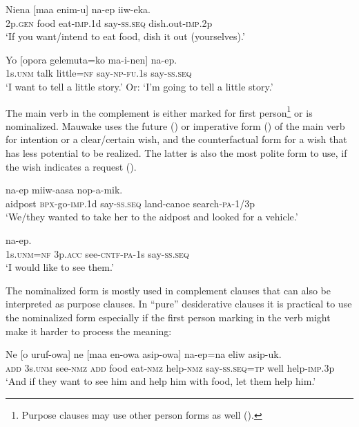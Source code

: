 \ea%
\label{ex:x367}
\gll Niena  [maa  enim-u]  na-ep  iiw-eka. \\
2p.\textsc{gen} food eat-\textsc{imp}.1d say-\textsc{ss}.\textsc{seq} dish.out-\textsc{imp}.2p\\
\glt`If you want/intend to eat food, dish it out (yourselves).'
\z


\ea%
\label{ex:x368}
\gll Yo  [opora  gelemuta=ko  ma-i-nen]  na-ep.\\
1s.\textsc{unm} talk  little=\textsc{nf} say-\textsc{np}-\textsc{fu}.1s  say-\textsc{ss}.\textsc{seq}\\
\glt`I want to tell a little story.' Or: `I'm going to tell a little story.'
\z


The main verb in the complement is either marked for first person\footnote{Purpose clauses may use other person forms as well ().} or is nominalized. Mauwake uses the future () or imperative form () of the main verb for intention or a clear/certain wish, and the counterfactual form for a wish that has less potential to be realized. The latter is also the most polite form to use, if the wish indicates a request (). 

\ea%
\label{ex:x369}
\gll [Haussik  p-ek-u]  na-ep  miiw-aasa  nop-a-mik.\\
aidpost \textsc{\textsc{bp}x}-go-\textsc{imp}.1d say-\textsc{ss}.\textsc{seq} land-canoe search-\textsc{pa}-1/3p\\
\glt`We/they wanted to take her to the aidpost and looked for a vehicle.'
\z


\ea%
\label{ex:x370}
\gll [Yo=ko  wia  uruf-ek-a-m] na-ep.\\
1s.\textsc{unm}=\textsc{nf} 3p.\textsc{acc} see-\textsc{cntf}-\textsc{pa}-1s say-\textsc{ss}.\textsc{seq}\\
\glt`I would like to see them.'
\z


The nominalized form is mostly used in complement clauses that can also be interpreted as purpose clauses. In ``pure'' desiderative clauses it is practical to use the nominalized form especially if the first person marking in the verb might make it harder to process the meaning:

\ea%
\label{ex:x1610}
\gll Ne  [o  uruf-owa]  ne  [maa  en-owa  asip-owa] na-ep=na  eliw  asip-uk.\\
\textsc{add} 3s.\textsc{unm} see-\textsc{nmz} \textsc{add} food  eat-\textsc{nmz} help-\textsc{nmz} say-\textsc{ss}.\textsc{seq}=\textsc{tp} well help-\textsc{imp}.3p\\
\glt`And if they want to see him and help him with food, let them help him.'
\z


